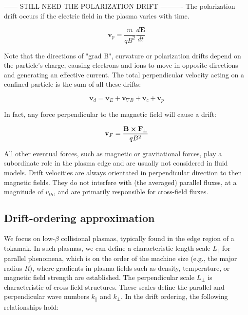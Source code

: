 ------ STILL NEED THE POLARIZATION DRIFT ----------
The polarization drift occurs if the electric field in the plasma varies with time. 

\begin{equation}
	\mathbf{v}_p = \frac{m}{qB^2}\frac{d\mathbf{E}}{dt}
\end{equation}

Note that the directions of "grad B", curvature or polarization drifts depend on the particle's charge, causing electrons and ions to move in opposite directions and generating an effective current. The total perpendicular velocity acting on a confined particle is the sum of all these drifts:

\begin{equation}
	\mathbf{v}_d = \mathbf{v}_E + \mathbf{v}_{\nabla B} + \mathbf{v}_c + \mathbf{v}_p
\end{equation}

In fact, any force perpendicular to the magnetic field will cause a drift:

\begin{equation}
	\mathbf{v}_F = \frac{\mathbf{B}\cross\mathbf{F}_\perp}{qB^2}
\end{equation}

All other eventual forces, such as magnetic or gravitational forces, play a subordinate role in the plasma edge and are usually not considered in fluid models. Drift velocities are always orientated in perpendicular direction to then magnetic fields. They do not interfere with (the averaged) parallel fluxes, at a magnitude of $v_{th}$, and are primarily responsible for cross-field fluxes.


\subsection{Drift-ordering approximation}
\label{ssec:edge_driftOrdering}

We focus on low-$\beta$ collisional plasmas, typically found in the edge region of a tokamak. In such plasmas, we can define a characteristic length scale $L_\parallel$ for parallel phenomena, which is on the order of the machine size (e.g., the major radius $R$), where gradients in plasma fields such as density, temperature, or magnetic field strength are established. The perpendicular scale $L_\perp$ is characteristic of cross-field structures. These scales define the parallel and perpendicular wave numbers $k_\parallel$ and $k_\perp$. In the drift ordering, the following relationships hold\cite{simakov_2003}:

